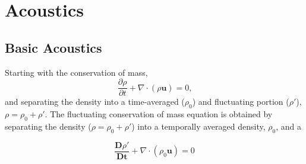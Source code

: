 
\section{Acoustics}

\subsection{Basic Acoustics}


Starting with the conservation of mass,
\begin{equation}
  \frac{\partial\rho}{\partial t}+\nabla\cdot\left(\rho\mathbf{u}\right)=0  \textrm{,}
  \label{eqn:02_cons_of_mass}
\end{equation}
and separating the density into a time-averaged ($\rho_0$) and fluctuating portion ($\rho'$), $\rho = \rho_0+\rho'$.
The fluctuating conservation of mass equation is obtained by separating the density ($\rho = \rho_0+\rho'$) into a temporally averaged density, $\rho_0$, and a

\begin{equation}
  \frac{\mathbf{D}\rho'}{\mathbf{Dt}}+\nabla\cdot\left(\rho_0\mathbf{u}\right)=0
  \label{eqn:02_cons_of_mass_fluc}
\end{equation}





